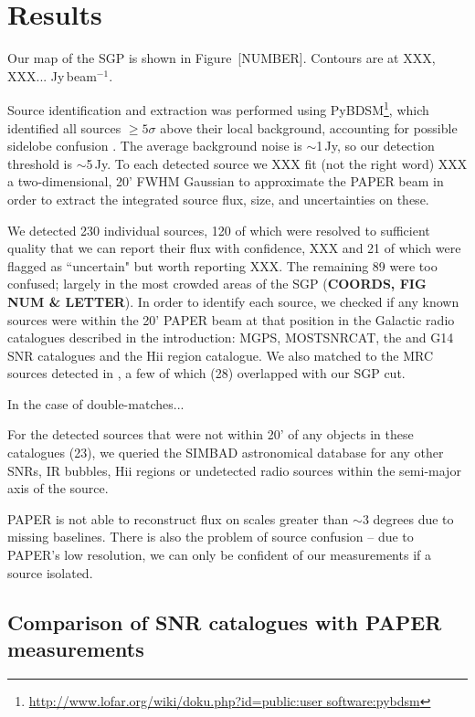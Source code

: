 \documentclass[useAMS,usenatbib]{mn2e}
\begin{document}
\section{Results}
\label{sec:res}

Our map of the SGP is shown in Figure~{\color{red}[NUMBER]}. Contours are at XXX, XXX... Jy\,beam$^{-1}$. 

Source identification and extraction was performed using PyBDSM\footnote{\url{http://www.lofar.org/wiki/doku.php?id=public:user software:pybdsm}}, which identified all sources $\geq5\sigma$ above their local background, accounting for possible sidelobe confusion \citep{PyBDSM.15}. The average background noise is $\sim$1\,Jy, so our detection threshold is $\sim$5\,Jy. To each detected source we XXX fit (not the right word) XXX a two-dimensional, 20' FWHM Gaussian to approximate the PAPER beam \citep{Parsons.10} in order to extract the integrated source flux, size, and uncertainties on these. 

We detected 230 individual sources, 120 of which were resolved to sufficient quality that we can report their flux with confidence, XXX and 21 of which were flagged as ``uncertain" but worth reporting XXX. The remaining 89 were too confused; largely in the most crowded areas of the SGP ({\bf COORDS, FIG NUM \& LETTER}). In order to identify each source, we checked if any known sources were within the 20' PAPER beam at that position in the Galactic radio catalogues described in the introduction: MGPS, MOSTSNRCAT, the \cite{AGreen.14} and G14 SNR catalogues and the \cite{Paladini.03} H{\sc ii} region catalogue. We also matched to the MRC sources detected in \cite{Jacobs.11}, a few of which (28) overlapped with our SGP cut. 

In the case of double-matches...

For the detected sources that were not within 20' of any objects in these catalogues (23), we queried the SIMBAD astronomical database \citep{Wegner.00} for any other SNRs,  IR bubbles, H{\sc ii} regions or undetected radio sources within the semi-major axis of the source.

PAPER is not able to reconstruct flux on scales greater than $\sim3$ degrees due to missing baselines.  There is also the problem of source confusion -- due to PAPER's low resolution, we can only be confident of our measurements if a source isolated.

\subsection{Comparison of SNR catalogues with PAPER measurements}
\label{subsec:G14}
\end{document}
